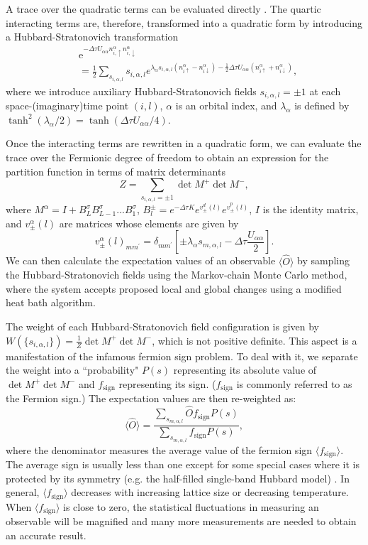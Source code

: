 \documentclass[reprint,nofootinbib,nobibnotes,amsmath,amssymb,aps,prb,floatfix]{revtex4-2}
\newcommand{\beq}{\begin{equation}}
\newcommand{\eeq}{\end{equation}}
\begin{document}
A trace over the quadratic terms can be evaluated directly \cite{BSS}. The quartic interacting terms are, therefore, transformed into a quadratic form by introducing a Hubbard-Stratonovich transformation
\beq\nonumber
\begin{split}
&\text{e}^{-\Delta\tau U_{\alpha\alpha}n^{\alpha}_{i,\uparrow}n^{\alpha}_{i,\downarrow}} \\&= \frac{1}{2}
\sum_{s_{i,\alpha,l}} s_{i,\alpha,l} 
e^{{\lambda_\alpha s_{i,\alpha,l} (n_{i\uparrow}^{\alpha}-n_{i\downarrow}^{\alpha})-\frac{1}{2}\Delta\tau U_{\alpha\alpha} (n^{\alpha}_{i\uparrow}+n^{\alpha}_{i\downarrow})}},
\end{split}
\eeq
where we introduce auxiliary Hubbard-Stratonovich fields $s_{i,\alpha,l}=\pm 1$ at each space-(imaginary)time point $(i,l)$, $\alpha$ is an orbital index, and $\lambda_{\alpha}$ is defined by $\tanh^2(\lambda_\alpha/2)=\tanh(\Delta\tau U_{\alpha\alpha}/4)$.  

Once the interacting terms are rewritten in a quadratic form, we can evaluate the trace over the Fermionic degree of freedom to obtain an expression for the partition function in terms of matrix determinants 
\begin{equation*}
    Z = \sum_{s_{i,\alpha,l}=\pm 1} \det M^{+} \det M^{-}, 
\end{equation*}
where
$M^{\alpha}=I + B^{\sigma}_LB^{\sigma}_{L-1}...B^{\sigma}_{1}$,
$B^{\pm}_l= e^{-\Delta\tau K} e^{v^d_{\pm}(l)}e^{v^p_{\pm}(l)}$, 
$I$ is the identity matrix, 
and $v^\alpha_{\pm}(l)$ are matrices whose elements are given by
\beq\nonumber
v^{\alpha}_{\pm}(l)_{mm^\prime}=\delta_{mm^\prime}\left[\pm \lambda_{\alpha}s_{m,\alpha,l} - \Delta\tau\frac{U_{\alpha\alpha}}{2} \right].
\eeq
We can then calculate the expectation values of an observable $\langle\hat{O}\rangle$ by sampling the Hubbard-Stratonovich fields using the Markov-chain Monte Carlo method, where the system accepts proposed local and global changes using a modified heat bath algorithm.

The weight of each Hubbard-Stratonovich field configuration is given by $W(\{s_{i,\alpha,l}\}) = \tfrac{1}{Z}\det M^{+} \det M^{-}$, which is not positive definite. This aspect is a manifestation of the infamous fermion sign problem. To deal with it, we separate the weight into a ``probability" $P(s)$ representing its absolute value of $\det M^{+} \det M^{-}$ and $f_\mathrm{sign}$ representing its sign. ($f_\mathrm{sign}$ is  commonly referred to as the Fermion sign.) The expectation values are then re-weighted as:
\beq\nonumber
\langle\hat{O}\rangle =\frac{\sum_{s_{m,\alpha,l}} \hat{O} f_\mathrm{sign} P(s)}{\sum_{s_{m,\alpha,l}} f_\mathrm{sign} P(s)},
\eeq
where the denominator measures the average value of the fermion sign $\langle f_\mathrm{sign}\rangle$. The average sign is usually less than one except for some special cases where it is protected by its symmetry (e.g. the half-filled single-band Hubbard model) \cite{Iglovikov2015}. In general, $\langle f_\mathrm{sign}\rangle$ decreases with increasing lattice size or decreasing temperature. When $\langle f_\mathrm{sign}\rangle$ is close to zero, the statistical fluctuations in measuring an observable will be magnified and many more measurements are needed to obtain an accurate result.
\end{document}
